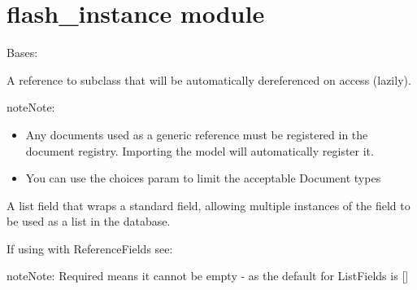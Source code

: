 \documentclass[letterpaper,10pt,english]{sphinxmanual}
\begin{document}
\chapter{flash\_instance module}
\label{\detokenize{flash_instance:flash-instance-module}}\label{\detokenize{flash_instance::doc}}\label{\detokenize{flash_instance:module-flash_instance}}

\begin{fulllineitems}
\label{\detokenize{flash_instance:flash_instance.FlashInstance}}
Bases: 

\begin{fulllineitems}
\label{\detokenize{flash_instance:flash_instance.FlashInstance.reference}}
A reference to   subclass
that will be automatically dereferenced on access (lazily).

\begin{sphinxadmonition}{note}{Note:}\begin{itemize}
\item {} 
Any documents used as a generic reference must be registered in the
document registry.  Importing the model will automatically register
it.

\item {} 
You can use the choices param to limit the acceptable Document types

\end{itemize}
\end{sphinxadmonition}


\end{fulllineitems}


\begin{fulllineitems}
\label{\detokenize{flash_instance:flash_instance.FlashInstance.responses}}
A list field that wraps a standard field, allowing multiple instances
of the field to be used as a list in the database.

If using with ReferenceFields see: 

\begin{sphinxadmonition}{note}{Note:}
Required means it cannot be empty - as the default for ListFields is {[}{]}
\end{sphinxadmonition}

\end{fulllineitems}


\end{fulllineitems}
\end{document}
